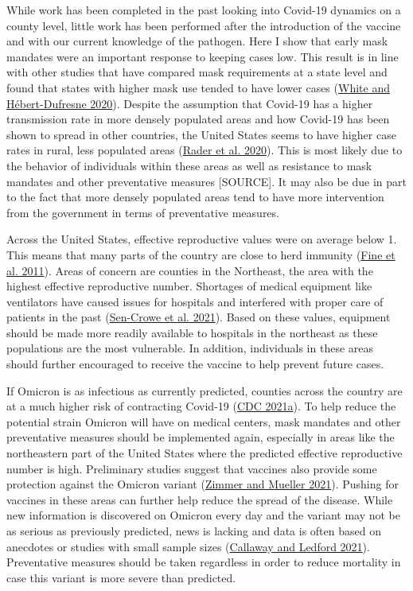 \documentclass[
  12pt,
]{article}
\begin{document}
While work has been completed in the past looking into Covid-19 dynamics on a county level, little work has been performed after the introduction of the vaccine and with our current knowledge of the pathogen. Here I show that early mask mandates were an important response to keeping cases low. This result is in line with other studies that have compared mask requirements at a state level and found that states with higher mask use tended to have lower cases (\protect\hyperlink{ref-white_state-level_2020}{White and Hébert-Dufresne 2020}). Despite the assumption that Covid-19 has a higher transmission rate in more densely populated areas and how Covid-19 has been shown to spread in other countries, the United States seems to have higher case rates in rural, less populated areas (\protect\hyperlink{ref-rader_crowding_2020}{Rader et al. 2020}). This is most likely due to the behavior of individuals within these areas as well as resistance to mask mandates and other preventative measures {[}SOURCE{]}. It may also be due in part to the fact that more densely populated areas tend to have more intervention from the government in terms of preventative measures.

Across the United States, effective reproductive values were on average below 1. This means that many parts of the country are close to herd immunity (\protect\hyperlink{ref-fine_herd_2011}{Fine et al. 2011}). Areas of concern are counties in the Northeast, the area with the highest effective reproductive number. Shortages of medical equipment like ventilators have caused issues for hospitals and interfered with proper care of patients in the past (\protect\hyperlink{ref-sen-crowe_closer_2021}{Sen-Crowe et al. 2021}). Based on these values, equipment should be made more readily available to hospitals in the northeast as these populations are the most vulnerable. In addition, individuals in these areas should further encouraged to receive the vaccine to help prevent future cases.

If Omicron is as infectious as currently predicted, counties across the country are at a much higher risk of contracting Covid-19 (\protect\hyperlink{ref-cdc_omicron_2021}{CDC 2021a}). To help reduce the potential strain Omicron will have on medical centers, mask mandates and other preventative measures should be implemented again, especially in areas like the northeastern part of the United States where the predicted effective reproductive number is high. Preliminary studies suggest that vaccines also provide some protection against the Omicron variant (\protect\hyperlink{ref-zimmer_covid_2021}{Zimmer and Mueller 2021}). Pushing for vaccines in these areas can further help reduce the spread of the disease. While new information is discovered on Omicron every day and the variant may not be as serious as previously predicted, news is lacking and data is often based on anecdotes or studies with small sample sizes (\protect\hyperlink{ref-callaway_how_2021}{Callaway and Ledford 2021}). Preventative measures should be taken regardless in order to reduce mortality in case this variant is more severe than predicted.
\end{document}
